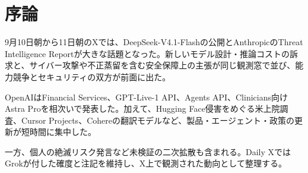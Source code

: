\section{序論}
9月10日朝から11日朝のXでは、DeepSeek-V4.1-Flashの公開とAnthropicのThreat Intelligence Reportが大きな話題となった。新しいモデル設計・推論コストの訴求と、サイバー攻撃や不正蒸留を含む安全保障上の主張が同じ観測窓で並び、能力競争とセキュリティの双方が前面に出た。

OpenAIはFinancial Services、GPT-Live-1 API、Agents API、Clinicians向けAstra Proを相次いで発表した。加えて、Hugging Face侵害をめぐる米上院調査、Cursor Projects、Cohereの翻訳モデルなど、製品・エージェント・政策の更新が短時間に集中した。

一方、個人の絶滅リスク発言など未検証の二次拡散も含まれる。Daily XではGrokが付した確度と注記を維持し、X上で観測された動向として整理する。
